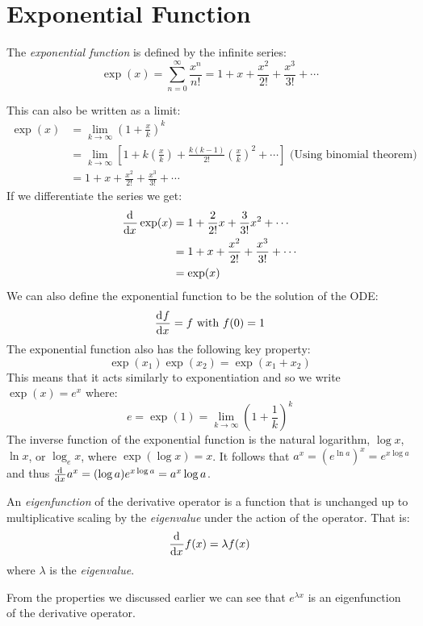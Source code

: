 \documentclass[../main.tex]{subfiles}
\begin{document}
\section{Exponential Function}
\begin{definition}
  The \textit{exponential function} is defined by the infinite series:
  \[
    \exp(x) = \sum_{n=0}^{\infty} \frac{x^{n}}{n!} = 1 + x + \frac{x^2}{2!} + \frac{x^3}{3!} + \cdots
  \]
\end{definition}
This can also be written as a limit:
\begin{align*}
  \exp(x) &= \lim_{k \to \infty} \left(1 + \frac{x}{k}\right)^{k} \\
          &= \lim_{k \to \infty} \left[1 + k\left(\frac{x}{k}\right) + \frac{k(k-1)}{2!}\left(\frac{x}{k}\right)^2 + \cdots\right] \text{ (Using binomial theorem)}\\
          &= 1 + x + \frac{x^2}{2!} + \frac{x^3}{3!} + \cdots
\end{align*}
If we differentiate the series we get:
\begin{align*}
  \deriv{}{x}\exp(x) &= 1 + \frac{2}{2!} x + \frac{3}{3!} x^2 + \cdots \\
                     &= 1 + x + \frac{x^2}{2!} + \frac{x^3}{3!} + \cdots \\
                     &= \exp(x)
\end{align*}
We can also define the exponential function to be the solution of the ODE:
\[
  \deriv{f}{x} = f \text{ with }f(0) = 1
\]
The exponential function also has the following key property:
\[
  \exp(x_1)\exp(x_2) = \exp(x_1 + x_2)
\]
This means that it acts similarly to exponentiation and so we write $\exp(x) = e^{x}$ where:
\[
  e = \exp(1) = \lim_{k \to \infty} \left(1 + \frac{1}{k}\right)^{k}
\]
The inverse function of the exponential function is the natural logarithm, $\log x$, $\ln x$, or $\log_{e} x$, where $\exp(\log x) = x$.
It follows that $a^{x} = (e^{\ln a})^{x} = e^{x \log a}$ and thus $\deriv{}{x}a^{x} = (\log a) e^{x \log a} = a^{x} \log a$.
\begin{definition}[Eigenfunction]
  An \textit{eigenfunction} of the derivative operator is a function that is unchanged up to multiplicative scaling by the \textit{eigenvalue} under the action of the operator.
  That is:
  \[
    \deriv{}{x}f(x) = \lambda f(x)
  \]
  where $\lambda$ is the \textit{eigenvalue}.
\end{definition}
From the properties we discussed earlier we can see that $e^{\lambda x}$ is an eigenfunction of the derivative operator.
\end{document}
